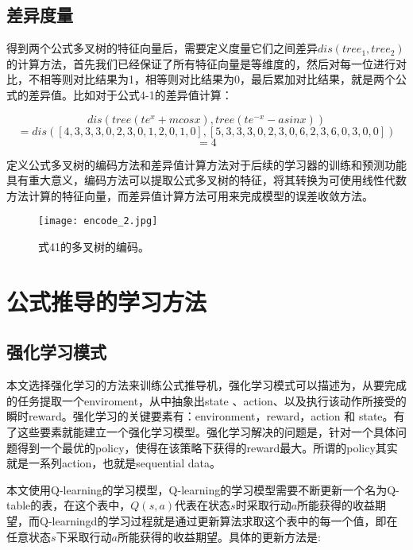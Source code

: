 \documentclass[runningheads]{llncs}
\begin{document}
\subsection{差异度量}
得到两个公式多叉树的特征向量后，需要定义度量它们之间差异$dis(tree_1,tree_2)$的计算方法，首先我们已经保证了所有特征向量是等维度的，然后对每一位进行对比，不相等则对比结果为1，相等则对比结果为0，最后累加对比结果，就是两个公式的差异值。比如对于公式4-1的差异值计算：

$$dis(tree(te^x+mcosx),tree(te^{-x}-asinx))$$
$$=dis([4,3,3,3,0,2,3,0,1,2,0,1,0],[5,3,3,3,0,2,3,0,6,2,3,6,0,3,0,0])$$
$$=4$$


定义公式多叉树的编码方法和差异值计算方法对于后续的学习器的训练和预测功能具有重大意义，编码方法可以提取公式多叉树的特征，将其转换为可使用线性代数方法计算的特征向量，而差异值计算方法可用来完成模型的误差收敛方法。

\begin{figure}[H]
\centering
\texttt{[image: encode\_2.jpg]}
\caption{式41的多叉树的编码。}
\end{figure}













\section{公式推导的学习方法}
\subsection{强化学习模式}
本文选择强化学习的方法来训练公式推导机，强化学习模式可以描述为，从要完成的任务提取一个enviroment，从中抽象出state 、action、以及执行该动作所接受的瞬时reward。强化学习的关键要素有：environment，reward，action 和 state。有了这些要素就能建立一个强化学习模型。强化学习解决的问题是，针对一个具体问题得到一个最优的policy，使得在该策略下获得的reward最大。所谓的policy其实就是一系列action，也就是sequential data。 

本文使用Q-learning的学习模型\cite{ref_proc1}，Q-learning的学习模型需要不断更新一个名为Q-table的表，在这个表中，$Q(s,a)$代表在状态$s$时采取行动$a$所能获得的收益期望，而Q-learningd的学习过程就是通过更新算法求取这个表中的每一个值，即在任意状态$s$下采取行动$a$所能获得的收益期望。具体的更新方法是:
\end{document}
